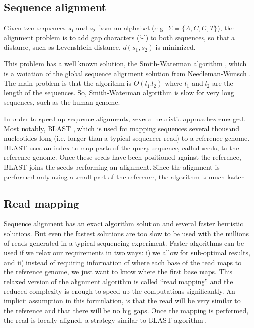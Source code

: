 \subsection{Sequence alignment}

Given two sequences $s_1$ and $s_2$ from an alphabet (e.g. $\Sigma = \{A,C,G,T\}$), the alignment problem is to add gap characters (`-') to both sequences, so that a distance, such as Levenshtein distance, $d(s_1,s_2)$ is minimized.

This problem has a well known solution, the Smith-Waterman algorithm \cite{smith1981identification}, which is a variation of the global sequence alignment solution from Needleman-Wunsch \cite{needleman1970general}. The main problem is that the algorithm is $O(l_1 . l_2)$ where $l_1$ and $l_2$ are the length of the sequences. So, Smith-Waterman algorithm is slow for very long sequences, such as the human genome.

In order to speed up sequence alignments, several heuristic approaches emerged. Most notably, BLAST \cite{altschul1990basic}, which is used for mapping sequences several thousand nucleotides long (i.e. longer than a typical sequencer read) to a reference genome. BLAST uses an index to map parts of the query sequence, called seeds, to the reference genome. Once these seeds have been positioned against the reference, BLAST joins the seeds performing an alignment. Since the alignment is performed only using a small part of the reference, the algorithm is much faster.  

\subsection{Read mapping}

Sequence alignment has an exact algorithm solution and several faster heuristic solutions. But even the fastest solutions are too slow to be used with the millions of reads generated in a typical sequencing experiment. Faster algorithms can be used if we relax our requirements in two ways: i) we allow for sub-optimal results, and ii) instead of requiring information of where each base of the read maps to the reference genome, we just want to know where the first base maps. This relaxed version of the alignment algorithm is called ``read mapping'' and the reduced complexity is enough to speed up the computations significantly. An implicit assumption in this formulation, is that the read will be very similar to the reference and that there will be no big gaps.  Once the mapping is performed, the read is locally aligned, a strategy similar to BLAST algorithm \cite{li2010fast, langmead2009ultrafast}.

